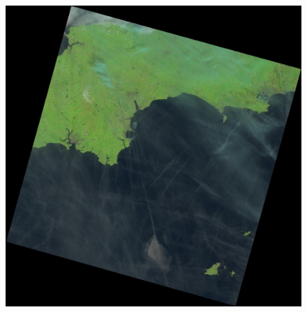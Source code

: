 \documentclass{book}
\begin{document}
\begin{figure}[H]
\begin{center}
\includegraphics[scale=0.18]{images/LC82030252013196LGN00.jpg}
\end{center}
\label{cloud3}
\end{figure}
\end{document}
